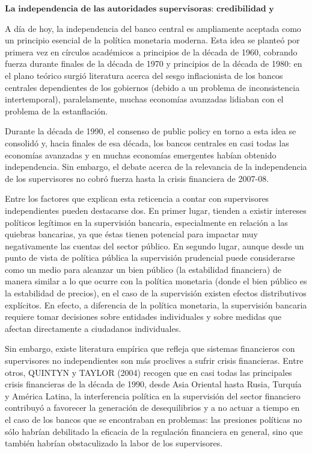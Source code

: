 \documentclass[10pt,a4paper]{article}
\begin{document}
$\textbf{La independencia de las autoridades supervisoras: credibilidad y legitimidad}$

A día de hoy, la independencia del banco central es ampliamente aceptada como un principio esencial de la política monetaria moderna. Esta idea se planteó por primera vez en círculos académicos a principios de la década de 1960, cobrando fuerza durante finales de la década de 1970 y principios de la década de 1980: en el plano teórico surgió literatura acerca del sesgo inflacionista de los bancos centrales dependientes de los gobiernos (debido a un problema de inconsistencia intertemporal), paralelamente, muchas economías avanzadas lidiaban con el problema de la estanflación. 

Durante la década de 1990, el consenso de public policy en torno a esta idea se consolidó y, hacia finales de esa década, los bancos centrales en casi todas las economías avanzadas y en muchas economías emergentes habían obtenido independencia. Sin embargo, el debate acerca de la relevancia de la independencia de los supervisores no cobró fuerza hasta la crisis financiera de 2007-08.

Entre los factores que explican esta reticencia a contar con supervisores independientes pueden destacarse dos. En primer lugar, tienden a existir intereses políticos legítimos en la supervisión bancaria, especialmente en relación a las quiebras bancarias, ya que éstas tienen potencial para impactar muy negativamente las cuentas del sector público. En segundo lugar, aunque desde un punto de vista de política pública la supervisión prudencial puede considerarse como un medio para alcanzar un bien público (la estabilidad financiera) de manera similar a lo que ocurre con la política monetaria (donde el bien público es la estabilidad de precios), en el caso de la supervisión existen efectos distributivos explícitos. En efecto, a diferencia de la política monetaria, la supervisión bancaria requiere tomar decisiones sobre entidades individuales y sobre medidas que afectan directamente a ciudadanos individuales.

Sin embargo, existe literatura empírica que refleja que sistemas financieros con supervisores no independientes son más proclives a sufrir crisis financieras. Entre otros, QUINTYN y TAYLOR (2004) recogen que en casi todas las principales crisis financieras de la década de 1990, desde Asia Oriental hasta Rusia, Turquía y América Latina, la interferencia política en la supervisión del sector financiero contribuyó a favorecer la generación de desequilibrios y a no actuar a tiempo en el caso de los bancos que se encontraban en problemas: las presiones políticas no sólo habrían debilitado la eficacia de la regulación financiera en general, sino que también habrían obstaculizado la labor de los supervisores. 
\end{document}
